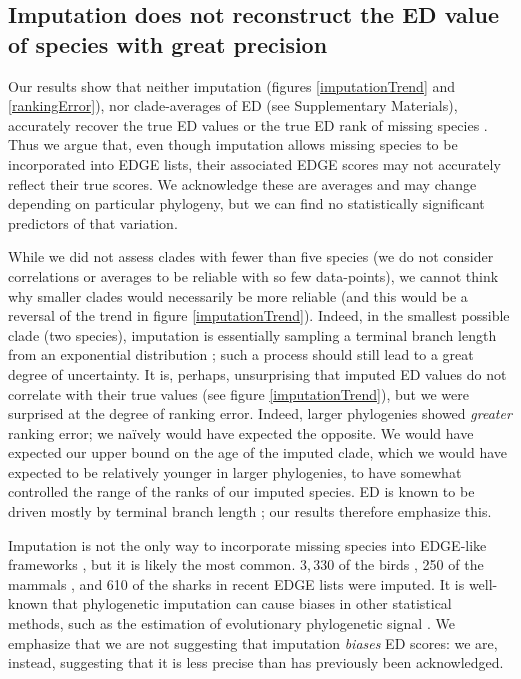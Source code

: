 \documentclass[10pt,english]{article}
\begin{document}
\subsection*{Imputation does not reconstruct the ED value of species with great precision}
Our results show that neither imputation (figures \ref{imputationTrend} and
\ref{rankingError}), nor clade-averages of ED (see Supplementary Materials), accurately recover the true ED values
or the true ED rank of missing species . Thus we argue that, even though imputation allows missing
species to be incorporated into EDGE lists, their associated EDGE scores may not
accurately reflect their true scores. We acknowledge these are averages and may
change depending on particular phylogeny, but we can find no statistically
significant predictors of that variation.

While we did not assess clades with fewer than five species (we do not consider
correlations or averages to be reliable with so few data-points), we cannot
think why smaller clades would necessarily be more reliable (and this would be a
reversal of the trend in figure \ref{imputationTrend}). Indeed, in the smallest
possible clade (two species), imputation is essentially sampling a terminal
branch length from an exponential distribution \autocite{Kuhn2011}; such a
process should still lead to a great degree of uncertainty. It is, perhaps,
unsurprising that imputed ED values do not correlate with their true values (see
figure \ref{imputationTrend}), but we were surprised at the degree of ranking error.
Indeed, larger phylogenies showed \emph{greater} ranking error; we na\"{i}vely
would have expected the opposite. We would have expected our upper bound on the
age of the imputed clade, which we would have expected to be relatively younger
in larger phylogenies, to have somewhat controlled the range of the ranks of our
imputed species. ED is known to be driven mostly by terminal branch length
\autocite{Redding2008, Isaac2007, Steel2007}; our results therefore emphasize
this.

Imputation is not the only way to incorporate missing species into EDGE-like
frameworks \autocite[see][]{Collen2011,Gumbs2018}, but it is likely the most common.
$3,330$ of the birds \autocite[\textasciitilde30\%;][]{Jetz2014}, 250 of the mammals
\autocite[\textasciitilde 5.6\%;][]{Collen2011}, and 610 of the sharks
\autocite[\textasciitilde49\%;][]{Stein2018} in recent EDGE lists were imputed.
It is well-known that phylogenetic imputation can cause biases in other
statistical methods, such as the estimation of evolutionary phylogenetic signal
\autocite{Rabosky2015}. We emphasize that we are not suggesting that imputation
\emph{biases} ED scores: we are, instead, suggesting that it is less precise
than has previously been acknowledged.
\end{document}
